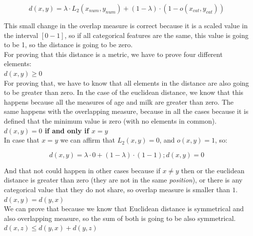 \documentclass[12pt]{article}
\begin{document}
\begin{equation}
    d(x, y) = \lambda \cdot  L_2(x_{num}, y_{num}) + (1-\lambda)\cdot(1 - o(x_{cat}, y_{cat}))
    \label{eq:eq-dist}
\end{equation}

This small change in the overlap measure is correct because it is a scaled value in the interval $[0-1]$, so if all categorical features are the same, this value is going to be 1, so the distance is going to be zero. \\

For proving that this distance is a metric, we have to prove four different elements: \\

\textbf{$d(x, y) \ge 0$}\\

For proving that, we have to know that all elements in the distance are also going to be greater than zero. In the case of the euclidean distance, we know that this happens because all the measures of age and milk are greater than zero. The same happens with the overlapping measure, because in all the cases because it is defined that the minimum value is zero (with no elements in common). \\

\textbf{$d(x, y) = 0$ if and only if $x=y$}\\

In case that $x=y$ we can affirm that $L_2(x, y) = 0$, and $o(x, y) = 1$, so:

\begin{equation}
    d(x, y) = \lambda \cdot 0 + (1-\lambda) \cdot (1-1); 
d(x, y) = 0
\end{equation}

And that not could happen in other cases because if $x \neq y$ then or the euclidean distance is greater than zero (they are not in the same \textit{position}), or there is any categorical value that they do not share, so overlap measure is smaller than $1$. \\

\textbf{$d(x, y) = d(y, x)$}\\

We can prove that because we know that Euclidean distance is symmetrical and also overlapping measure, so the sum of both is going to be also symmetrical. \\

\textbf{$d(x, z) \leq d(y, x) + d(y, z)$}\\
\end{document}
